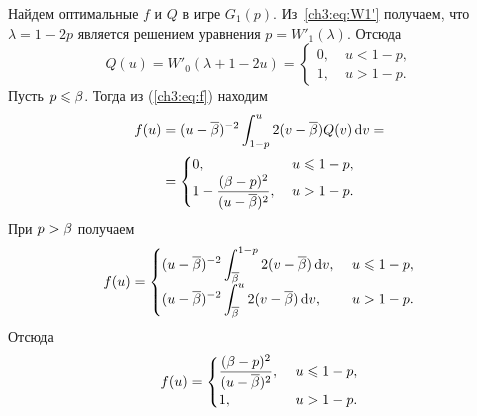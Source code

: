 {\begin{example}
  Найдем оптимальные $f$ и $Q$ в игре $G_1(p)$.
  Из~\eqref{ch3:eq:W1'} получаем, что $\lambda = 1 - 2p$ является решением уравнения $p = W'_1(\lambda)$.
  Отсюда
  \begin{equation*}
    Q(u) = W'_0(\lambda + 1 - 2u) = \begin{cases}
      0, &\; u < 1 - p,\\
      1, &\; u > 1 - p.
    \end{cases}
  \end{equation*}
  Пусть $p \leqslant \beta$.
  Тогда из (\ref{ch3:eq:f}) находим
  \begin{align*}
    f(u) 
    &=
      (u - {{\overline{\beta}}})^{-2} \int_{1-p}^u 2 (v - {{\overline{\beta}}}) Q(v) \mathop{}\!\mathrm{d} v = \\
    &=
      \begin{cases}
        0, &\; u \leqslant 1 - p,\\
        1 - {\displaystyle \frac{(\beta - p)^2}{(u-{{\overline{\beta}}})^2}}, &\; u > 1 - p.
      \end{cases}
  \end{align*}
  При $p > \beta$ получаем
  \begin{equation*}
    f(u)= \begin{cases}
      {\displaystyle (u-\DCo)^{-2} \int_\DCo^{1-p} 2 (v - \DCo) \di v},\ & u \leq 1 - p,\\
      {\displaystyle (u - \DCo)^{-2} \int_\DCo^u 2 (v - \DCo) \di v},\ & u > 1 - p.
    \end{cases}                                                     
  \end{equation*}
  Отсюда
  \begin{equation*}
    f(u) = \begin{cases}
      {\displaystyle \frac{(\ensuremath{\beta}- p)^2}{(u - \ensuremath{{{\overline{\beta}}}})^2}},\ & u \leqslant 1 - p,\\
      1,\ & u > 1 - p.
    \end{cases}  
  \end{equation*}
\end{example}

}
